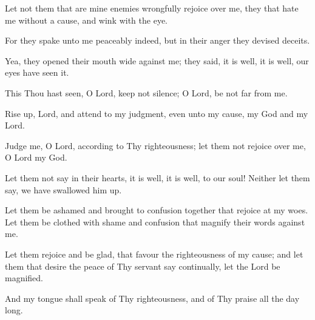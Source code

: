 Let not them that are mine enemies wrongfully rejoice over me, they that hate me without a cause, and wink with the eye.

For they spake unto me peaceably indeed, but in their anger they devised deceits.

Yea, they opened their mouth wide against me; they said, it is well, it is well, our eyes have seen it.

This Thou hast seen, O Lord, keep not silence; O Lord, be not far from me.

Rise up, Lord, and attend to my judgment, even unto my cause, my God and my Lord.

Judge me, O Lord, according to Thy righteousness; let them not rejoice over me, O Lord my God.

Let them not say in their hearts, it is well, it is well, to our soul! Neither let them say, we have swallowed him up.

Let them be ashamed and brought to confusion together that rejoice at my woes. Let them be clothed with shame and confusion that magnify their words against me.

Let them rejoice and be glad, that favour the righteousness of my cause; and let them that desire the peace of Thy servant say continually, let the Lord be magnified.

And my tongue shall speak of Thy righteousness, and of Thy praise all the day long.

